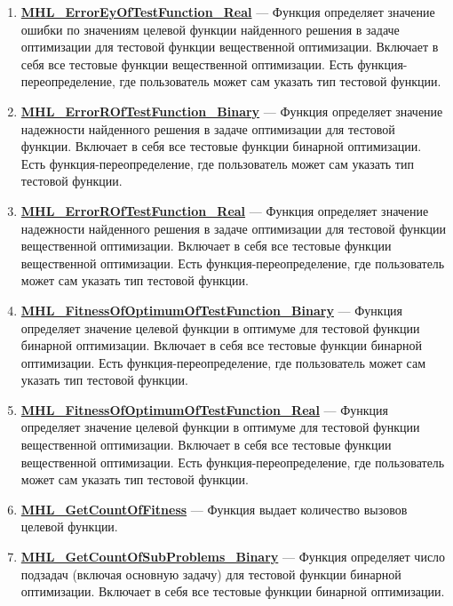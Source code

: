 \documentclass[a4paper,12pt]{article}
\begin{document}
\begin{enumerate}
\item \textbf{\hyperref[MHL_ErrorEyOfTestFunction_Real]{MHL\_ErrorEyOfTestFunction\_Real}} --- Функция определяет значение ошибки по значениям целевой функции найденного решения в задаче оптимизации для тестовой функции вещественной оптимизации. Включает в себя все тестовые функции вещественной оптимизации. Есть функция-переопределение, где пользователь может сам указать тип тестовой функции.

\item \textbf{\hyperref[MHL_ErrorROfTestFunction_Binary]{MHL\_ErrorROfTestFunction\_Binary}} --- Функция определяет значение надежности найденного решения в задаче оптимизации для тестовой функции. Включает в себя все тестовые функции бинарной оптимизации. Есть функция-переопределение, где пользователь может сам указать тип тестовой функции.

\item \textbf{\hyperref[MHL_ErrorROfTestFunction_Real]{MHL\_ErrorROfTestFunction\_Real}} --- Функция определяет значение надежности найденного решения в задаче оптимизации для тестовой функции вещественной оптимизации. Включает в себя все тестовые функции  вещественной оптимизации. Есть функция-переопределение, где пользователь может сам указать тип тестовой функции.

\item \textbf{\hyperref[MHL_FitnessOfOptimumOfTestFunction_Binary]{MHL\_FitnessOfOptimumOfTestFunction\_Binary}} --- Функция определяет значение целевой функции в оптимуме для тестовой функции бинарной оптимизации. Включает в себя все тестовые функции бинарной оптимизации. Есть функция-переопределение, где пользователь может сам указать тип тестовой функции.

\item \textbf{\hyperref[MHL_FitnessOfOptimumOfTestFunction_Real]{MHL\_FitnessOfOptimumOfTestFunction\_Real}} --- Функция определяет значение целевой функции в оптимуме для тестовой функции вещественной оптимизации. Включает в себя все тестовые функции вещественной оптимизации. Есть функция-переопределение, где пользователь может сам указать тип тестовой функции.

\item \textbf{\hyperref[MHL_GetCountOfFitness]{MHL\_GetCountOfFitness}} --- Функция выдает количество вызовов целевой функции.

\item \textbf{\hyperref[MHL_GetCountOfSubProblems_Binary]{MHL\_GetCountOfSubProblems\_Binary}} --- Функция определяет число подзадач (включая основную задачу) для тестовой функции бинарной оптимизации. Включает в себя все тестовые функции бинарной оптимизации.


\end{enumerate}
\end{document}
